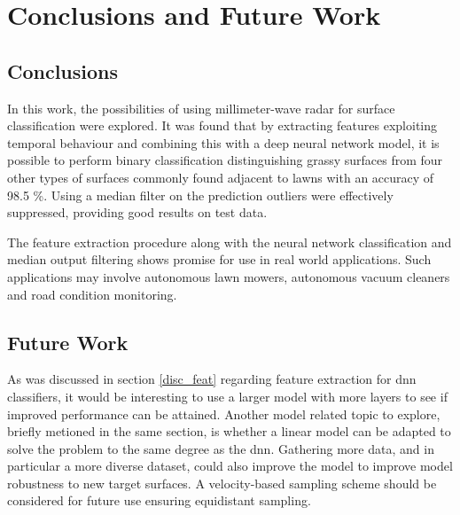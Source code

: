 \chapter{Conclusions and Future Work}

\section{Conclusions}

In this work, the possibilities of using millimeter-wave radar for surface classification were explored. It was found that by extracting features exploiting temporal behaviour and combining this with a deep neural network model, it is possible to perform binary classification distinguishing grassy surfaces from four other types of surfaces commonly found adjacent to lawns with an accuracy of 98.5 \%. Using a median filter on the prediction outliers were effectively suppressed, providing good results on test data. 

The feature extraction procedure along with the neural network classification and median output filtering shows promise for use in real world applications. Such applications may involve autonomous lawn mowers, autonomous vacuum cleaners and road condition monitoring. 



\section{Future Work}
As was discussed in section \ref{disc_feat} regarding feature extraction for \gls{dnn} classifiers, it would be interesting to use a larger model with more layers to see if improved performance can be attained. Another model related topic to explore, briefly metioned in the same section, is whether a linear model can be adapted to solve the problem to the same degree as the \gls{dnn}. Gathering more data, and in particular a more diverse dataset, could also improve the model to improve model robustness to new target surfaces. A velocity-based sampling scheme should be considered for future use ensuring equidistant sampling.


